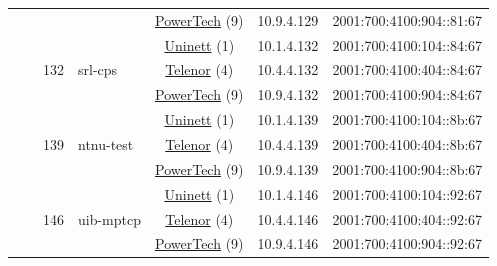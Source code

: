 \begin{small}
\begin{center}
\begin{longtable}{|c|c|c|c|c|c|c|c|}
  &  &  &  & \multicolumn{2}{|c|}{\tiny{\href{http://www.powertech.no}{PowerTech} (9)}} & \tiny{10.9.4.129} & \tiny{2001:700:4100:904::81:67} \\* \cline{3-3}\cline{4-4}\cline{5-5}\cline{6-6}\cline{7-7}\cline{8-8}
  &  & \multirow{3}{*}{\tiny{132}} & \multicolumn{1}{|l|}{\multirow{3}{*}{\tiny{srl-cps}}} & \multicolumn{2}{|c|}{\tiny{\href{https://www.uninett.no}{Uninett} (1)}} & \tiny{10.1.4.132} & \tiny{2001:700:4100:104::84:67} \\* \cline{5-5}\cline{6-6}\cline{7-7}\cline{8-8}
  &  &  &  & \multicolumn{2}{|c|}{\tiny{\href{https://www.telenor.no}{Telenor} (4)}} & \tiny{10.4.4.132} & \tiny{2001:700:4100:404::84:67} \\* \cline{5-5}\cline{6-6}\cline{7-7}\cline{8-8}
  &  &  &  & \multicolumn{2}{|c|}{\tiny{\href{http://www.powertech.no}{PowerTech} (9)}} & \tiny{10.9.4.132} & \tiny{2001:700:4100:904::84:67} \\* \cline{3-3}\cline{4-4}\cline{5-5}\cline{6-6}\cline{7-7}\cline{8-8}
  &  & \multirow{3}{*}{\tiny{139}} & \multicolumn{1}{|l|}{\multirow{3}{*}{\tiny{ntnu-test}}} & \multicolumn{2}{|c|}{\tiny{\href{https://www.uninett.no}{Uninett} (1)}} & \tiny{10.1.4.139} & \tiny{2001:700:4100:104::8b:67} \\* \cline{5-5}\cline{6-6}\cline{7-7}\cline{8-8}
  &  &  &  & \multicolumn{2}{|c|}{\tiny{\href{https://www.telenor.no}{Telenor} (4)}} & \tiny{10.4.4.139} & \tiny{2001:700:4100:404::8b:67} \\* \cline{5-5}\cline{6-6}\cline{7-7}\cline{8-8}
  &  &  &  & \multicolumn{2}{|c|}{\tiny{\href{http://www.powertech.no}{PowerTech} (9)}} & \tiny{10.9.4.139} & \tiny{2001:700:4100:904::8b:67} \\* \cline{3-3}\cline{4-4}\cline{5-5}\cline{6-6}\cline{7-7}\cline{8-8}
  &  & \multirow{3}{*}{\tiny{146}} & \multicolumn{1}{|l|}{\multirow{3}{*}{\tiny{uib-mptcp}}} & \multicolumn{2}{|c|}{\tiny{\href{https://www.uninett.no}{Uninett} (1)}} & \tiny{10.1.4.146} & \tiny{2001:700:4100:104::92:67} \\* \cline{5-5}\cline{6-6}\cline{7-7}\cline{8-8}
  &  &  &  & \multicolumn{2}{|c|}{\tiny{\href{https://www.telenor.no}{Telenor} (4)}} & \tiny{10.4.4.146} & \tiny{2001:700:4100:404::92:67} \\* \cline{5-5}\cline{6-6}\cline{7-7}\cline{8-8}
  &  &  &  & \multicolumn{2}{|c|}{\tiny{\href{http://www.powertech.no}{PowerTech} (9)}} & \tiny{10.9.4.146} & \tiny{2001:700:4100:904::92:67} \\* \cline{3-3}\cline{4-4}\cline{5-5}\cline{6-6}\cline{7-7}\cline{8-8}

\end{longtable}
\end{center}
\end{small}
